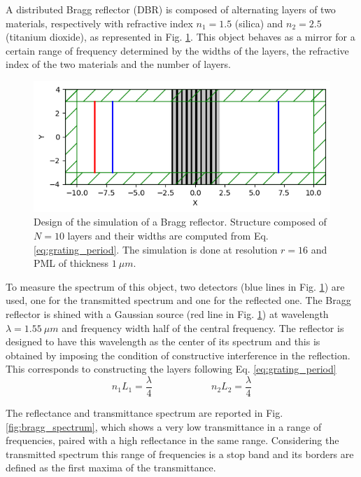 A distributed Bragg reflector (DBR) is composed of alternating layers of two materials, respectively with refractive index \(n_1 = 1.5\) (silica) and \(n_2 = 2.5\) (titanium dioxide), as represented in Fig. \ref{fig:bragg_design}. This object behaves as a mirror for a certain range of frequency determined by the widths of the layers, the refractive index of the two materials and the number of layers.

\begin{figure}[H]
    \centering
    \includegraphics[width=0.8\linewidth]{Figures/bragg_design.png}
    \caption{Design of the simulation of a Bragg reflector. Structure composed of \(N=10\) layers and their widths are computed from Eq. \ref{eq:grating_period}. The simulation is done at resolution \(r=16\) and PML of thickness \(1\ \mu m\).}
    \label{fig:bragg_design}
\end{figure}

To measure the spectrum of this object, two detectors (blue lines in Fig. \ref{fig:bragg_design}) are used, one for the transmitted spectrum and one for the reflected one. The Bragg reflector is shined with a Gaussian source (red line in Fig. \ref{fig:bragg_design}) at wavelength \(\lambda = 1.55\ \mu m\) and frequency width half of the central frequency. The reflector is designed to have this wavelength as the center of its spectrum and this is obtained by imposing the condition of constructive interference in the reflection. This corresponds to constructing the layers following Eq. \ref{eq:grating_period}  
\begin{equation}\label{eq:grating_period}
    n_1 L_1 = \frac{\lambda}{4} \qquad\qquad\qquad n_2 L_2 = \frac{\lambda}{4}
\end{equation}

The reflectance and transmittance spectrum are reported in Fig. \ref{fig:bragg_spectrum}, which shows a very low transmittance in a range of frequencies, paired with a high reflectance in the same range. Considering the transmitted spectrum this range of frequencies is a stop band and its borders are defined as the first maxima of the transmittance.


